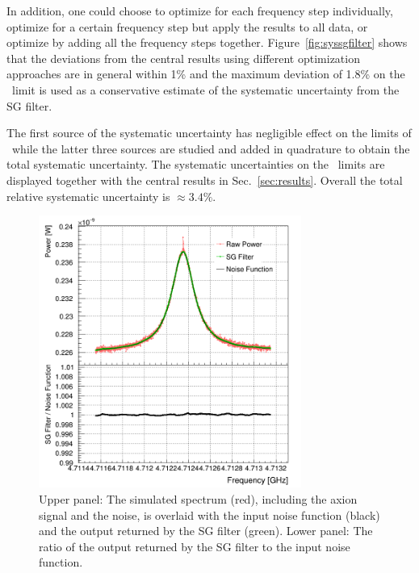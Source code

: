 \begin{itemize}
In addition, one could choose to optimize for each frequency step 
individually, optimize for a certain frequency step but apply the results to 
all data, or optimize by adding all the frequency steps together. 
Figure~\ref{fig:syssgfilter} shows that 
the deviations from the central results using different optimization 
approaches are in general within 1\% and the 
maximum deviation of 1.8\% 
on the \gagg\ limit is used as a conservative estimate of the systematic 
uncertainty from the SG filter. 

\end{itemize}

The first source of the systematic uncertainty 
has negligible effect on the limits of \gagg\ while the 
latter three sources are studied and added in quadrature to obtain the total 
systematic uncertainty. The systematic uncertainties on the \gagg\ limits 
are displayed together with the central results in Sec.~\ref{sec:results}. 
Overall the total relative systematic uncertainty is $\approx 3.4\%$.

\begin{figure} [htbp]
  \centering
  \includegraphics[width=8.6cm]{figures/GeneratedSpectrum_Optimized_SGFilter_NPar_3_Window_141.png}
  \caption{Upper panel: 
 The simulated spectrum (red), including the axion signal and the 
noise, is overlaid with the input noise function (black) and the output 
returned by the SG filter (green). Lower panel: The ratio of the output 
returned by the SG filter to the input noise function.}
  \label{fig:sgcompare}
\end{figure}


